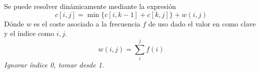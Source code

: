 \documentclass[tikz,11pt,fleqn]{book} %
\begin{document}
\begin{theorem}
    Se puede resolver dinámicamente mediante la expresión
    $$ c[i,j]=\min\{c[i,k-1]+c[k,j] \}+w(i,j) $$
    Dónde $w$ es el coste asociado a la frecuencia $f$ de uso dado el valor en como clave y el índice como $i,j$.
    $$ w(i,j)=\sum_{i}^jf(i) $$
    \textit{Ignorar     índice 0, tomar desde 1.}
\end{theorem}
\end{document}
